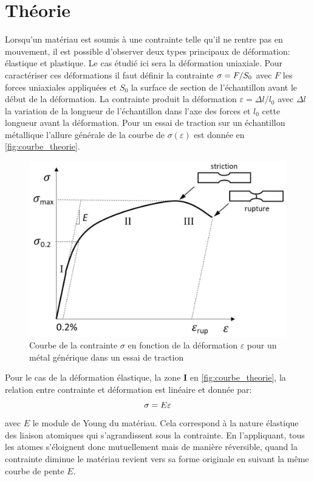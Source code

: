 \section{Théorie}
\label{sec:theorie}
Lorsqu'un matériau est soumis à une contrainte telle qu'il ne rentre pas en mouvement, il est possible d'observer deux types principaux de déformation: élastique et plastique. Le cas étudié ici sera la déformation uniaxiale. Pour caractériser ces déformations il faut définir la contrainte $\sigma = F/S_0$ avec $F$ les forces uniaxiales appliquées et $S_0$ la surface de section de l'échantillon avant le début de la déformation. La contrainte produit la déformation $\varepsilon = \Delta l / l_0$ avec $\Delta l$ la variation de la longueur de l'échantillon dans l'axe des forces et $l_0$ cette longueur avant la déformation. Pour un essai de traction sur un échantillon métallique l'allure générale de la courbe de $\sigma(\varepsilon)$ est donnée en \autoref{fig:courbe_theorie}.
\begin{figure}[h]
    \centering
    \includegraphics[width=0.6\linewidth]{figures/courbe_traction.png}
    \caption{Courbe de la contrainte $\sigma$ en fonction de la déformation $\varepsilon$ pour un métal générique dans un essai de traction \cite{notice}}
    \label{fig:courbe_theorie}
\end{figure}

Pour le cas de la déformation élastique, la zone $\mathbf{I}$ en \autoref{fig:courbe_theorie}, la relation entre contrainte et déformation est linéaire et donnée par:
\begin{equation}
    \sigma = E \varepsilon
\end{equation}
avec $E$ le module de Young du matériau. Cela correspond à la nature élastique des liaison atomiques qui s'agrandissent sous la contrainte. En l'appliquant, tous les atomes s'éloignent donc mutuellement mais de manière réversible, quand la contrainte diminue le matériau revient vers sa forme originale en suivant la même courbe de pente $E$.

